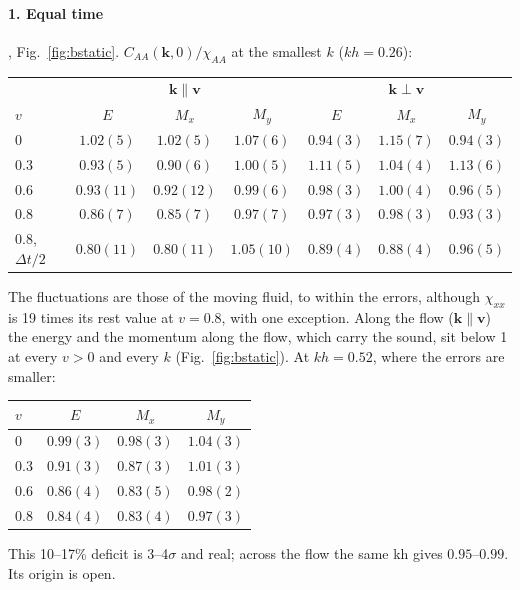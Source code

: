 \documentclass[11pt,aps,preprint,nofootinbib,superscriptaddress,tightenlines]{revtex4-2}
\def\Fig#1{Fig.~\ref{#1}}
\let\oldparagraph\paragraph
\renewcommand{\paragraph}{\par\bigskip\oldparagraph}
\begin{document}
\paragraph{1. Equal time}, \Fig{fig:bstatic}.  $C_{AA}(\bm k,0)/\chi_{AA}$ at the smallest $k$ ($kh=0.26$):
\begin{center}
\begin{tabular}{lcccccc}
\hline
 & \multicolumn{3}{c}{$\bm k\parallel\bm v$} & \multicolumn{3}{c}{$\bm k\perp\bm v$} \\
$v$ & $E$ & $M_x$ & $M_y$ & $E$ & $M_x$ & $M_y$ \\ \hline
0 & $1.02(5)$ & $1.02(5)$ & $1.07(6)$ & $0.94(3)$ & $1.15(7)$ & $0.94(3)$ \\
0.3 & $0.93(5)$ & $0.90(6)$ & $1.00(5)$ & $1.11(5)$ & $1.04(4)$ & $1.13(6)$ \\
0.6 & $0.93(11)$ & $0.92(12)$ & $0.99(6)$ & $0.98(3)$ & $1.00(4)$ & $0.96(5)$ \\
0.8 & $0.86(7)$ & $0.85(7)$ & $0.97(7)$ & $0.97(3)$ & $0.98(3)$ & $0.93(3)$ \\
0.8, $\Delta t/2$ & $0.80(11)$ & $0.80(11)$ & $1.05(10)$ & $0.89(4)$ & $0.88(4)$ & $0.96(5)$ \\
\hline
\end{tabular}
\end{center}
The fluctuations are those of the moving fluid, to within the errors, although $\chi_{xx}$ is 19 times
its rest value at $v=0.8$, with one exception.  Along the flow ($\bm k\parallel\bm v$) the energy and the
momentum along the flow, which carry the sound, sit below 1 at every $v>0$ and every $k$
(\Fig{fig:bstatic}).  At $kh=0.52$, where the errors are smaller:
\begin{center}
\begin{tabular}{lccc}
\hline
$v$ & $E$ & $M_x$ & $M_y$ \\ \hline
0 & $0.99(3)$ & $0.98(3)$ & $1.04(3)$ \\
0.3 & $0.91(3)$ & $0.87(3)$ & $1.01(3)$ \\
0.6 & $0.86(4)$ & $0.83(5)$ & $0.98(2)$ \\
0.8 & $0.84(4)$ & $0.83(4)$ & $0.97(3)$ \\
\hline
\end{tabular}
\end{center}
This 10--17\% deficit is 3--4$\sigma$ and real; across the flow the same kh gives $0.95$--$0.99$.  Its origin is open.
\end{document}
